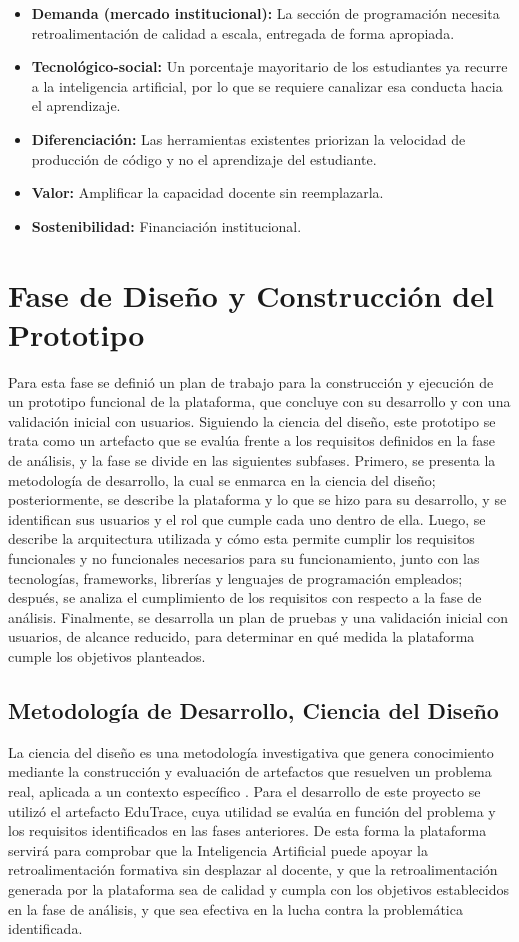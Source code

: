 \documentclass[letterpaper, 10 pt, conference]{ieeeconf}
\begin{document}
\begin{itemize}
	\item \textbf{Demanda (mercado institucional):} La sección de programación necesita retroalimentación de calidad a escala, entregada de forma apropiada.
	\item \textbf{Tecnológico-social:} Un porcentaje mayoritario de los estudiantes ya recurre a la inteligencia artificial, por lo que se requiere canalizar esa conducta hacia el aprendizaje.
	\item \textbf{Diferenciación:} Las herramientas existentes priorizan la velocidad de producción de código y no el aprendizaje del estudiante.
	\item \textbf{Valor:} Amplificar la capacidad docente sin reemplazarla.
	\item \textbf{Sostenibilidad:} Financiación institucional.
\end{itemize}

\section{Fase de Diseño y Construcción del Prototipo}
Para esta fase se definió un plan de trabajo para la construcción y ejecución de un prototipo funcional de la plataforma, que concluye con su desarrollo y con una validación inicial con usuarios.
Siguiendo la ciencia del diseño, este prototipo se trata como un artefacto que se evalúa frente a los requisitos definidos en la fase de análisis, y la fase se divide en las siguientes subfases.
Primero, se presenta la metodología de desarrollo, la cual se enmarca en la ciencia del diseño; posteriormente, se describe la plataforma y lo que se hizo para su desarrollo, y se identifican sus usuarios y el rol que cumple cada uno dentro de ella.
Luego, se describe la arquitectura utilizada y cómo esta permite cumplir los requisitos funcionales y no funcionales necesarios para su funcionamiento, junto con las tecnologías, frameworks, librerías y lenguajes de programación empleados; después, se analiza el cumplimiento de los requisitos con respecto a la fase de análisis.
Finalmente, se desarrolla un plan de pruebas y una validación inicial con usuarios, de alcance reducido, para determinar en qué medida la plataforma cumple los objetivos planteados.
\subsection{Metodología de Desarrollo, Ciencia del Diseño}
La ciencia del diseño es una metodología investigativa que genera conocimiento mediante la construcción y evaluación de artefactos que resuelven un problema real, aplicada a un contexto específico \cite{25}.
Para el desarrollo de este proyecto se utilizó el artefacto EduTrace, cuya utilidad se evalúa en función del problema y los requisitos identificados en las fases anteriores.
De esta forma la plataforma servirá para comprobar que la Inteligencia Artificial puede apoyar la retroalimentación formativa sin desplazar al docente, y que la retroalimentación generada por la plataforma sea de calidad y cumpla con los objetivos establecidos en la fase de análisis,
y que sea efectiva en la lucha contra la problemática identificada.
\end{document}
